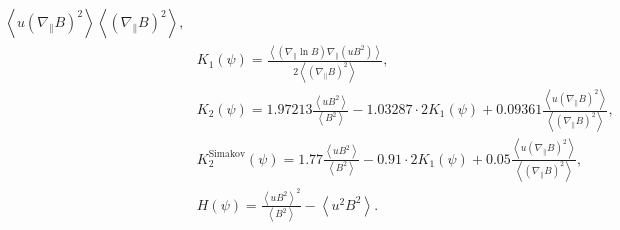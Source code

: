 \documentclass[12pt,superscriptaddress]{revtex4}
\begin{document}
{\begin{align}
\begin{split}
{ \left\langle {u} \left( {\nabla}_\| {B}\right)^2\right\rangle}{\left\langle \left( {\nabla}_\| {B}\right)^2\right\rangle},  \\
& {K}_1 \left(\psi\right) %
 = \frac{\left\langle \left( {\nabla}_\| \ln {B}\right)  {\nabla}_\| \left({u} {B}^2\right)\right\rangle}{2 \left\langle \left( {\nabla}_\| {B}\right)^2\right\rangle}, \\
& {K}_2 \left(\psi\right) %
 = 1.97213 \frac{\left\langle {u} {B}^2  \right\rangle}{\left\langle {B}^2  \right\rangle} - 1.03287 \cdot 2 {K}_1 \left(\psi\right)
 + 0.09361 \frac{
 \left\langle {u} \left( {\nabla}_\| {B}\right)^2\right\rangle}{\left\langle \left( {\nabla}_\| {B}\right)^2\right\rangle}, \\
&  {K}_{2}^{\mathrm{Simakov}} \left(\psi\right) %
  = 1.77 \frac{\left\langle {u} {B}^2  \right\rangle}{\left\langle {B}^2  \right\rangle} - 0.91 \cdot 2 {K}_1 \left(\psi\right)
 + 0.05 \frac{
 \left\langle {u} \left( {\nabla}_\| {B}\right)^2\right\rangle}{\left\langle \left( {\nabla}_\| {B}\right)^2\right\rangle}, \\
& {H} \left(\psi\right) %
 = \frac{\left\langle {u} {B}^2  \right\rangle^2}{\left\langle {B}^2  \right\rangle} - \left\langle {u}^2 {B}^2  \right\rangle.
\label{eq:PSregimeFunctions}
\end{split}
\end{align}
}


\end{document}

